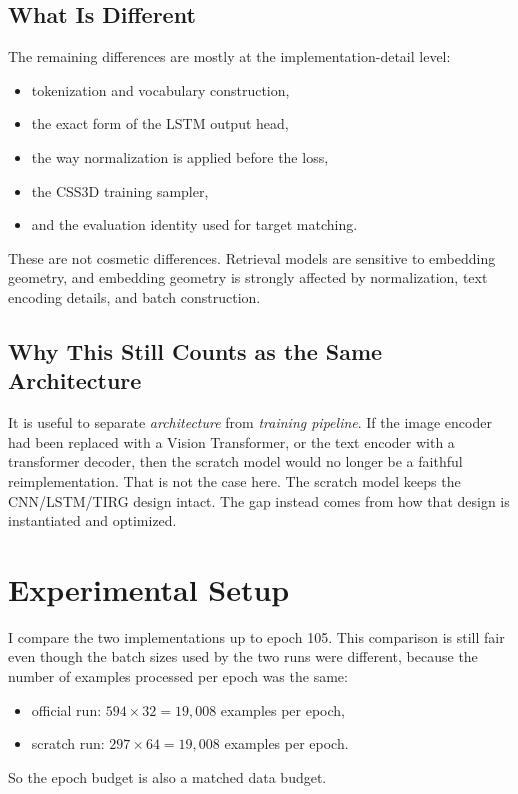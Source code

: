 \documentclass[11pt]{article}
\begin{document}
\subsection{What Is Different}
The remaining differences are mostly at the implementation-detail level:
\begin{itemize}[leftmargin=*]
  \item tokenization and vocabulary construction,
  \item the exact form of the LSTM output head,
  \item the way normalization is applied before the loss,
  \item the CSS3D training sampler,
  \item and the evaluation identity used for target matching.
\end{itemize}

These are not cosmetic differences. Retrieval models are sensitive to embedding geometry, and embedding geometry is strongly affected by normalization, text encoding details, and batch construction.

\subsection{Why This Still Counts as the Same Architecture}
It is useful to separate \textit{architecture} from \textit{training pipeline}. If the image encoder had been replaced with a Vision Transformer, or the text encoder with a transformer decoder, then the scratch model would no longer be a faithful reimplementation. That is not the case here. The scratch model keeps the CNN/LSTM/TIRG design intact. The gap instead comes from how that design is instantiated and optimized.

\section{Experimental Setup}
I compare the two implementations up to epoch 105. This comparison is still fair even though the batch sizes used by the two runs were different, because the number of examples processed per epoch was the same:
\begin{itemize}[leftmargin=*]
  \item official run: $594 \times 32 = 19{,}008$ examples per epoch,
  \item scratch run: $297 \times 64 = 19{,}008$ examples per epoch.
\end{itemize}

So the epoch budget is also a matched data budget.
\end{document}
